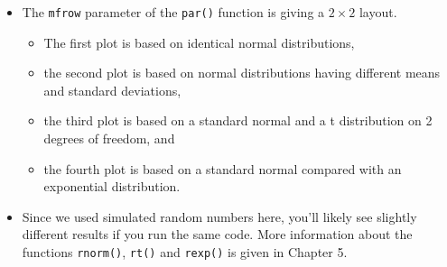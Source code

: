 \documentclass[
  9pt,
  a4paper,
  ignorenonframetext,
  notheorems]{beamer}
\providecommand{\tightlist}{%
  \setlength{\itemsep}{0pt}\setlength{\parskip}{0pt}}\usepackage{longtable,booktabs,array}
\begin{document}
\begin{frame}[fragile]
\begin{itemize}
\tightlist
\item
  The \texttt{mfrow} parameter of the \texttt{par()} function is giving
  a \(2 \times 2\) layout.

  \begin{itemize}
  \tightlist
  \item
    The first plot is based on identical normal distributions,
  \item
    the second plot is based on normal distributions having different
    means and standard deviations,
  \item
    the third plot is based on a standard normal and a t distribution on
    2 degrees of freedom, and
  \item
    the fourth plot is based on a standard normal compared with an
    exponential distribution.
  \end{itemize}
\item
  Since we used simulated random numbers here, you'll likely see
  slightly different results if you run the same code. More information
  about the functions \texttt{rnorm()}, \texttt{rt()} and
  \texttt{rexp()} is given in Chapter 5.
\end{itemize}
\end{frame}
\end{document}

